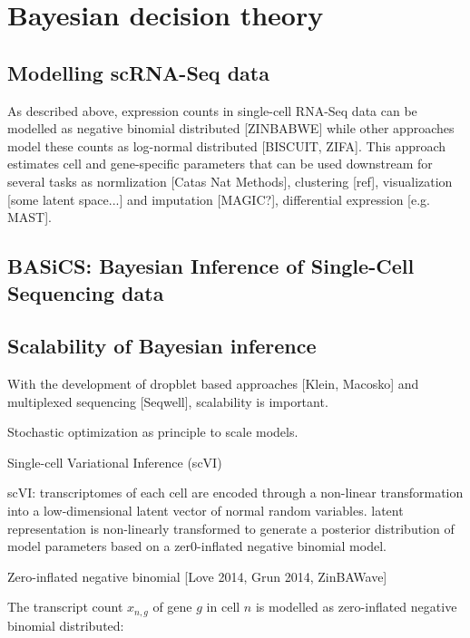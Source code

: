 
\section{Bayesian decision theory}

\subsection{Modelling scRNA-Seq data}

As described above, expression counts in single-cell RNA-Seq data can be modelled as negative binomial distributed [ZINBABWE] while other approaches model these counts as log-normal distributed [BISCUIT, ZIFA]. This approach estimates cell and gene-specific parameters that can be used downstream for several tasks as normlization [Catas Nat Methods], clustering [ref], visualization [some latent space...] and imputation [MAGIC?], differential expression [e.g. MAST].  

\subsection{BASiCS: Bayesian Inference of Single-Cell Sequencing data} 

\subsection{Scalability of Bayesian inference}

With the development of dropblet based approaches [Klein, Macosko] and multiplexed sequencing [Seqwell], scalability is important.

Stochastic optimization as principle to scale models.

Single-cell Variational Inference (scVI) 

scVI: transcriptomes of each cell are encoded through a non-linear transformation into a low-dimensional latent vector of normal random variables. latent representation is non-linearly transformed to generate a posterior distribution of model parameters based on a zer0-inflated negative binomial model. 

Zero-inflated negative binomial [Love 2014, Grun 2014, ZinBAWave]

The transcript count $x_{n,g}$ of gene $g$ in cell $n$ is modelled as zero-inflated negative binomial distributed:

